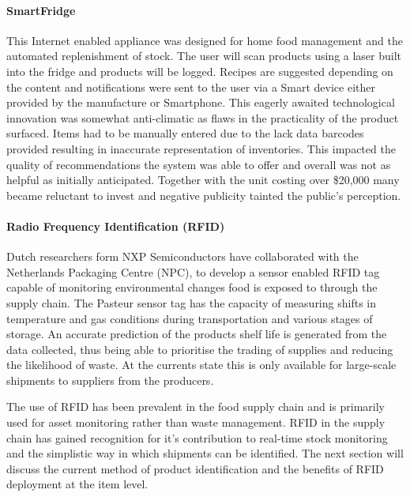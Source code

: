 \documentclass[a4paper, 11pt]{article}
\begin{document}
\paragraph{SmartFridge}
This Internet enabled appliance was designed for home food management and the automated replenishment of stock. The user will scan products using a laser built into the fridge and products will be logged. Recipes are suggested depending on the content and notifications were sent to the user via a Smart device either provided by the manufacture or Smartphone. This eagerly awaited technological innovation was somewhat anti-climatic as flaws in the practicality of the product surfaced. Items had to be manually entered due to the lack data barcodes provided resulting in inaccurate representation of inventories. This impacted the quality of recommendations the system was able to offer and overall was not as helpful as initially anticipated. Together with the unit costing over \$20,000 many became reluctant to invest and negative publicity tainted the public's perception.\cite{idiotFridge}

\paragraph{Radio Frequency Identification (RFID)}
Dutch researchers form NXP Semiconductors have collaborated with the Netherlands Packaging Centre (NPC),  to develop a sensor enabled RFID tag capable of monitoring environmental changes food is exposed to through the supply chain.\cite{rfidFood} The Pasteur sensor tag has the capacity of measuring shifts in temperature and gas conditions during transportation and various stages of storage. An accurate prediction of the products shelf life is generated from the data collected, thus being able to prioritise the trading of supplies and reducing the likelihood of waste. At the currents state this is only available for large-scale shipments to suppliers from the producers.

The use of RFID has been prevalent in the food supply chain and is primarily used for asset monitoring rather than waste management. RFID in the supply chain has gained recognition for it's contribution to real-time stock monitoring and the simplistic way in which shipments can be identified.\cite{RFID} The next section will discuss the current method of product identification and the benefits of RFID deployment at the item level.


\vspace{\baselineskip}
\vspace{\baselineskip}
\vspace{\baselineskip}
\end{document}
